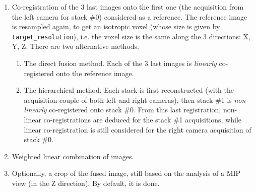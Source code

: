 \begin{enumerate}
\item \label{it:fusion:registration} Co-registration of the 3 last images onto the first one (the acquisition from the left camera for stack \#0) considered as a reference. The reference image is resampled again, to get an isotropic voxel (whose size is given by \verb|target_resolution|), i.e. the voxel size is the same along the 3 directions: X, Y, Z. There are two alternative methods.
\begin{enumerate}
\itemsep -0.5ex
\item The direct fusion method. Each of the  3 last images is \textit{linearly} co-registered onto the reference image.
\item The hierarchical method. Each stack is first reconstructed (with the acquisition couple of both left and right cameras), then stack \#1 is \textit{non-linearly} co-registered onto stack \#0. From this last registration, non-linear co-registrations are deduced for the stack \#1 acquisitions, while linear co-registration is still considered for the right camera acquisition of stack \#0.
\end{enumerate}

\item \label{it:fusion:combination} Weighted linear combination of images.

\item  \label{it:fusion:crop:2} Optionally, a crop of the fused image, still based on the analysis of a MIP view (in the Z direction). By default, it is done.
\end{enumerate}






